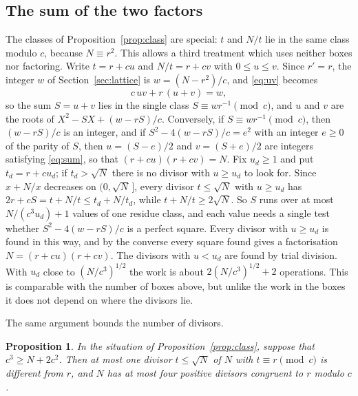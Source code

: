 \documentclass[11pt,reqno]{amsart}
\numberwithin{equation}{section}
\theoremstyle{plain}
\newtheorem{proposition}[theorem]{Proposition}
\theoremstyle{definition}
\theoremstyle{remark}
\begin{document}
\subsection{The sum of the two factors}\label{sec:sum}
The classes of Proposition~\ref{prop:class} are special: $t$ and $N/t$
lie in the same class modulo $c$, because $N\equiv r^2$. This allows a
third treatment which uses neither boxes nor factoring. Write $t=r+cu$
and $N/t=r+cv$ with $0\le u\le v$. Since $r'=r$, the integer $w$ of Section~\ref{sec:lattice} is $w=(N-r^2)/c$, and \eqref{eq:uv} becomes
\begin{equation}\label{eq:sum}
  c\,uv+r\,(u+v)=w ,
\end{equation}
so the sum $S=u+v$ lies in the single class $S\equiv wr^{-1}\pmod c$,
and $u$ and $v$ are the roots of $X^2-SX+(w-rS)/c$. Conversely, if
$S\equiv wr^{-1}\pmod c$, then $(w-rS)/c$ is an integer, and if
$S^2-4(w-rS)/c=e^2$ with an integer $e\ge0$ of the parity of $S$, then
$u=(S-e)/2$ and $v=(S+e)/2$ are integers satisfying \eqref{eq:sum}, so
that $(r+cu)(r+cv)=N$. Fix $u_d\ge1$ and put $t_d=r+cu_d$; if
$t_d>\sqrt N$ there is no divisor with $u\ge u_d$ to look for. Since
$x+N/x$ decreases on $(0,\sqrt N\,]$, every divisor $t\le\sqrt N$ with
$u\ge u_d$ has $2r+cS=t+N/t\le t_d+N/t_d$, while $t+N/t\ge2\sqrt N$.
So $S$ runs over at most $N/(c^3u_d)+1$ values of one residue class,
and each value needs a single test whether $S^2-4(w-rS)/c$ is a
perfect square. Every divisor with $u\ge u_d$ is found in this way,
and by the converse every square found gives a factorisation
$N=(r+cu)(r+cv)$. The divisors with $u<u_d$ are found by trial division. With $u_d$ close to $(N/c^3)^{1/2}$ the work
is about $2(N/c^3)^{1/2}+2$ operations. This is comparable with the
number of boxes above, but unlike the work in the boxes it does not
depend on where the divisors lie.

The same argument bounds the number of divisors.

\begin{proposition}\label{prop:fourdiv}
In the situation of Proposition~\ref{prop:class}, suppose that
$c^3\ge N+2c^2$. Then at most one divisor $t\le\sqrt N$ of $N$ with
$t\equiv r\pmod c$ is different from $r$, and $N$ has at most four
positive divisors congruent to $r$ modulo $c$.
\end{proposition}
\end{document}
